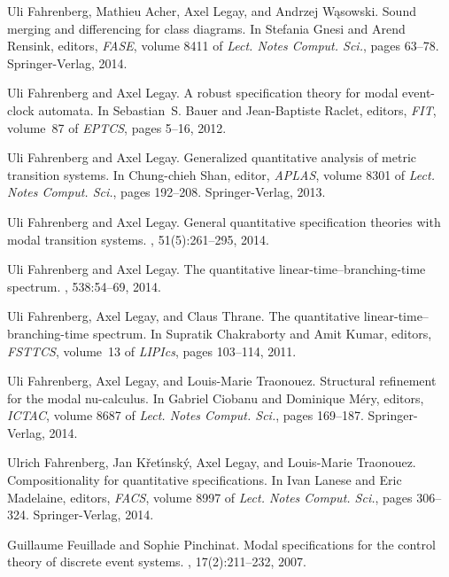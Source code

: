 \documentclass[twocolumn]{svjour3-dummy}
\begin{document}
\begin{thebibliography}{10}
Uli Fahrenberg, Mathieu Acher, Axel Legay, and Andrzej W{\k a}sowski.
\newblock Sound merging and differencing for class diagrams.
\newblock In Stefania Gnesi and Arend Rensink, editors, {\em FASE}, volume 8411
  of {\em {Lect. Notes Comput. Sci.}}, pages 63--78. {Springer-Verlag}, 2014.

Uli Fahrenberg and Axel Legay.
\newblock A robust specification theory for modal event-clock automata.
\newblock In Sebastian~S. Bauer and Jean{-}Baptiste Raclet, editors, {\em FIT},
  volume~87 of {\em EPTCS}, pages 5--16, 2012.

Uli Fahrenberg and Axel Legay.
\newblock Generalized quantitative analysis of metric transition systems.
\newblock In Chung{-}chieh Shan, editor, {\em APLAS}, volume 8301 of {\em
  {Lect. Notes Comput. Sci.}}, pages 192--208. {Springer-Verlag}, 2013.

Uli Fahrenberg and Axel Legay.
\newblock General quantitative specification theories with modal transition
  systems.
, 51(5):261--295, 2014.

Uli Fahrenberg and Axel Legay.
\newblock The quantitative linear-time--branch\-ing-time spectrum.
, 538:54--69, 2014.

Uli Fahrenberg, Axel Legay, and Claus Thrane.
\newblock The quantitative linear-time--branching-time spectrum.
\newblock In Supratik Chakraborty and Amit Kumar, editors, {\em FSTTCS},
  volume~13 of {\em LIPIcs}, pages 103--114, 2011.

Uli Fahrenberg, Axel Legay, and Louis-Marie Traonouez.
\newblock Structural refinement for the modal nu-calculus.
\newblock In Gabriel Ciobanu and Dominique M{\'{e}}ry, editors, {\em ICTAC},
  volume 8687 of {\em {Lect. Notes Comput. Sci.}}, pages 169--187.
  {Springer-Verlag}, 2014.

Ulrich Fahrenberg, Jan K{\v r}et{\'{\i}}nsk{\'{y}}, Axel Legay, and
  Louis{-}Marie Traonouez.
\newblock Compositionality for quantitative specifications.
\newblock In Ivan Lanese and Eric Madelaine, editors, {\em FACS}, volume 8997
  of {\em {Lect. Notes Comput. Sci.}}, pages 306--324. {Springer-Verlag}, 2014.

Guillaume Feuillade and Sophie Pinchinat.
\newblock Modal specifications for the control theory of discrete event
  systems.
, 17(2):211--232, 2007.


\end{thebibliography}
\end{document}
